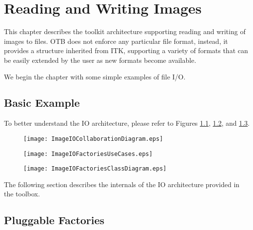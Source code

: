 \chapter{Reading and Writing Images}
\label{sec:IO}

This chapter describes the toolkit architecture supporting reading and
writing of images to files. OTB does not enforce any particular file
format, instead, it provides a structure inherited from ITK,
supporting a variety of formats that can be easily extended by the
user as new formats become available.

We begin the chapter with some simple examples of file I/O.

\section{Basic Example}
\label{sec:ImagReadWrite}


To better understand the IO architecture, please refer to Figures 
\ref{fig:ImageIOCollaborationDiagram}, 
\ref{fig:ImageIOFactoriesUseCases}, and
\ref{fig:ImageIOFactoriesClassDiagram}. 

\begin{figure}
\center
\texttt{[image: ImageIOCollaborationDiagram.eps]}
 \label{fig:ImageIOCollaborationDiagram}
\end{figure}

\begin{figure}
\center
\texttt{[image: ImageIOFactoriesUseCases.eps]}
\label{fig:ImageIOFactoriesUseCases}
\end{figure}

\begin{figure}
\center
\texttt{[image: ImageIOFactoriesClassDiagram.eps]}
\label{fig:ImageIOFactoriesClassDiagram}
\end{figure}


The following section describes the internals of the IO architecture provided
in the toolbox.

\section{Pluggable Factories}
\label{sec:ImageIOPluggableFactories}

